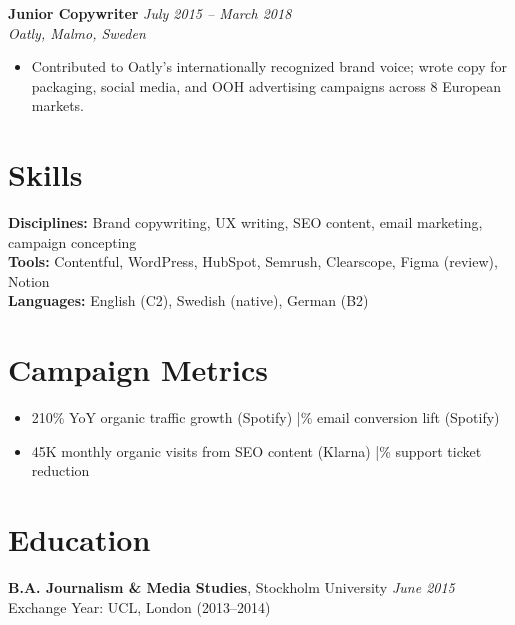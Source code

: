 \documentclass[11pt,a4paper]{article}
\begin{document}
\vspace{4pt}
\noindent\textbf{Junior Copywriter} \hfill \textit{July 2015 -- March 2018}\\
\textit{Oatly, Malmo, Sweden}
\begin{itemize}
  \item Contributed to Oatly's internationally recognized brand voice; wrote copy for packaging, social media, and OOH advertising campaigns across 8 European markets.
\end{itemize}

\section{Skills}
\textbf{Disciplines:} Brand copywriting, UX writing, SEO content, email marketing, campaign concepting\\
\textbf{Tools:} Contentful, WordPress, HubSpot, Semrush, Clearscope, Figma (review), Notion\\
\textbf{Languages:} English (C2), Swedish (native), German (B2)

\section{Campaign Metrics}
\begin{itemize}
  \item 210\% YoY organic traffic growth (Spotify) \quad|\% email conversion lift (Spotify)
  \item 45K monthly organic visits from SEO content (Klarna) \quad|\% support ticket reduction
\end{itemize}

\section{Education}
\textbf{B.A. Journalism \& Media Studies}, Stockholm University \hfill \textit{June 2015}\\
Exchange Year: UCL, London (2013--2014)
\end{document}
